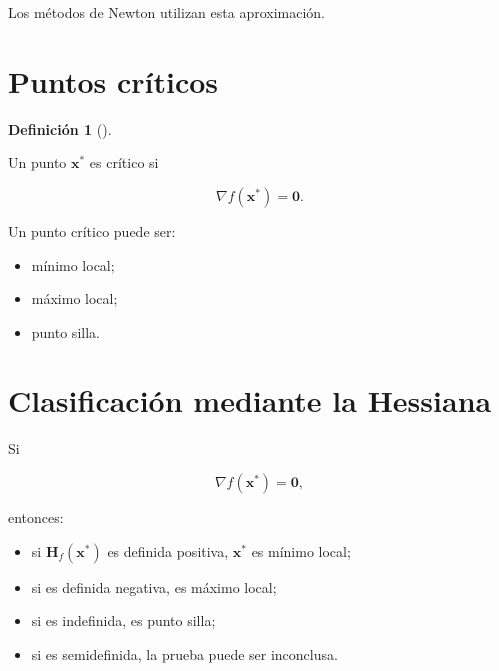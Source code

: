 \documentclass[
  spanish,
  10.5pt,
  letterpaper,
  DIV=11,
  numbers=noendperiod,
  oneside,
  open=any]{scrreprt}
\providecommand{\tightlist}{%
  \setlength{\itemsep}{0pt}\setlength{\parskip}{0pt}}
\theoremstyle{definition}
\newtheorem{definition}{Definición}[chapter]
\theoremstyle{definition}
\theoremstyle{plain}
\theoremstyle{remark}
\begin{document}
Los métodos de Newton utilizan esta aproximación.

\section*{Puntos críticos}\label{puntos-cruxedticos}


\begin{definition}[]\protect\hypertarget{def-punto-critico}{}\label{def-punto-critico}

Un punto \(\mathbf{x}^{*}\) es crítico si

\[
\nabla f(\mathbf{x}^{*})
=
\mathbf{0}.
\]

\end{definition}

Un punto crítico puede ser:

\begin{itemize}
\tightlist
\item
  mínimo local;
\item
  máximo local;
\item
  punto silla.
\end{itemize}

\section*{Clasificación mediante la
Hessiana}\label{clasificaciuxf3n-mediante-la-hessiana}


Si

\[
\nabla f(\mathbf{x}^{*})=\mathbf{0},
\]

entonces:

\begin{itemize}
\tightlist
\item
  si \(\mathbf{H}_f(\mathbf{x}^{*})\) es definida positiva,
  \(\mathbf{x}^{*}\) es mínimo local;
\item
  si es definida negativa, es máximo local;
\item
  si es indefinida, es punto silla;
\item
  si es semidefinida, la prueba puede ser inconclusa.
\end{itemize}
\end{document}
